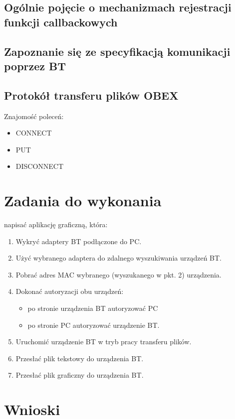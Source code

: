 \documentclass[a4paper,12pt]{extarticle}  %
\begin{document}
\subsection{Ogólnie pojęcie o mechanizmach rejestracji funkcji callbackowych}
\subsection{Zapoznanie się ze specyfikacją komunikacji poprzez BT}
\subsection{Protokół transferu plików OBEX}
Znajomość poleceń:
\begin{itemize}
	\item CONNECT
	\item PUT
	\item DISCONNECT
\end{itemize}
\section{Zadania do wykonania}
napisać aplikację graficzną, która:
\begin{enumerate}
	\item Wykryć adaptery BT podłączone do PC.
	\item Użyć wybranego adaptera do zdalnego wyszukiwania urządzeń BT.
	\item Pobrać adres MAC wybranego (wyszukanego w pkt. 2) urządzenia.
	\item Dokonać autoryzacji obu urządzeń:
	      \begin{itemize}
		      \item po stronie urządzenia BT autoryzować PC
		      \item po stronie PC autoryzować urządzenie BT.
	      \end{itemize}
	\item Uruchomić urządzenie BT w tryb pracy transferu plików.
	\item Przesłać plik tekstowy do urządzenia BT.
	\item Przesłać plik graficzny do urządzenia BT.
\end{enumerate}
\section{Wnioski}
\end{document}
